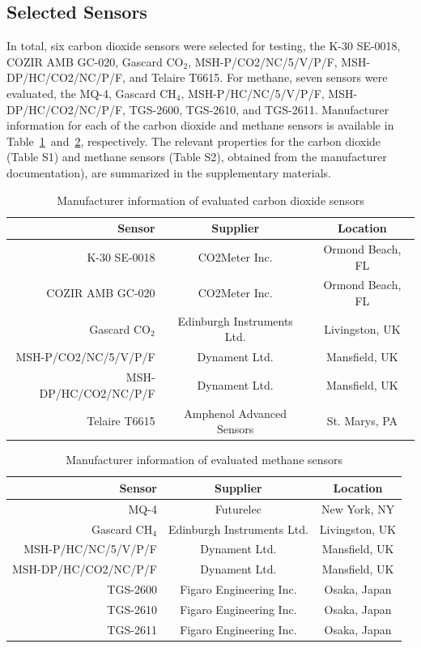 \documentclass[times]{joehreview}
\begin{document}
	\subsection*{Selected Sensors}
	
	In total, six carbon dioxide sensors were selected for testing, the K-30 SE-0018, COZIR AMB GC-020, Gascard CO$_{2}$, MSH-P/CO2/NC/5/V/P/F, MSH-DP/HC/CO2/NC/P/F, and Telaire T6615.  For methane, seven sensors were evaluated, the MQ-4, Gascard CH$_{4}$, MSH-P/HC/NC/5/V/P/F, MSH-DP/HC/CO2/NC/P/F, TGS-2600, TGS-2610, and TGS-2611.  Manufacturer information for each of the carbon dioxide and methane sensors is available in Table~\ref{tab:CO2supplier}~and~\ref{tab:CH4supplier}, respectively.  The relevant properties for the carbon dioxide (Table S1) and methane sensors (Table S2), obtained from the manufacturer documentation), are summarized in the supplementary materials.  
	
	\begin{table}[!th]
		\caption{Manufacturer information of evaluated carbon dioxide sensors}
		\label{tab:CO2supplier}
		\begin{tabular}{ r | c c }
			Sensor               & Supplier                    & Location         \\ \hline
			K-30 SE-0018         & CO2Meter  Inc.              & Ormond Beach, FL \\
			COZIR AMB GC-020     & CO2Meter  Inc.              & Ormond Beach, FL \\
			Gascard CO$_2$       & Edinburgh Instruments Ltd.  & Livingston, UK   \\
			MSH-P/CO2/NC/5/V/P/F & Dynament Ltd.               & Mansfield, UK    \\
			MSH-DP/HC/CO2/NC/P/F & Dynament Ltd.               & Mansfield, UK    \\
			Telaire T6615        & Amphenol Advanced Sensors   & St. Marys, PA 
		\end{tabular}
	\end{table}
	
	\begin{table}[!th]
		\caption{Manufacturer information of evaluated methane sensors}
		\label{tab:CH4supplier}
		\begin{tabular}{ r | c c }
			Sensor               & Supplier                   & Location       \\ \hline
			MQ-4                 & Futurelec                  & New York, NY   \\
			Gascard CH$_4$       & Edinburgh Instruments Ltd. & Livingston, UK \\
			MSH-P/HC/NC/5/V/P/F  & Dynament Ltd.              & Mansfield, UK  \\
			MSH-DP/HC/CO2/NC/P/F & Dynament Ltd.              & Mansfield, UK  \\
			TGS-2600             & Figaro Engineering Inc.    & Osaka, Japan   \\
			TGS-2610             & Figaro Engineering Inc.    & Osaka, Japan   \\
			TGS-2611             & Figaro Engineering Inc.    & Osaka, Japan 
		\end{tabular}
	\end{table}
	
\end{document}
